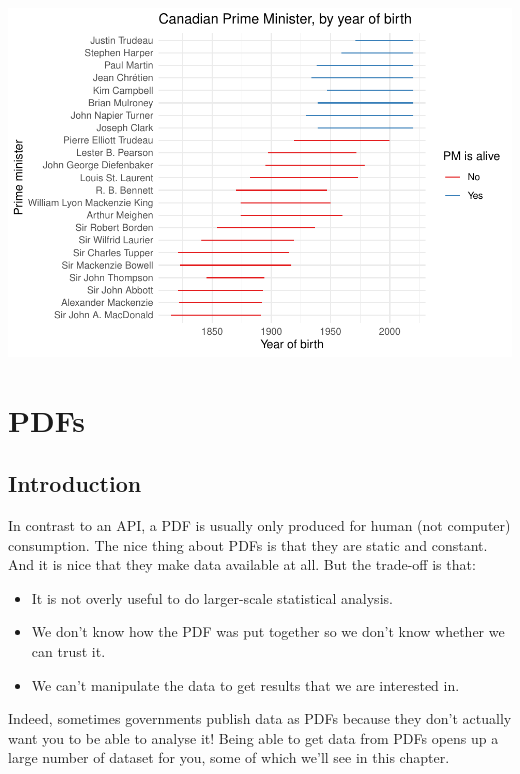 \documentclass[
]{book}
\providecommand{\tightlist}{%
  \setlength{\itemsep}{0pt}\setlength{\parskip}{0pt}}
\begin{document}
\includegraphics{telling_stories_with_data_files/figure-latex/unnamed-chunk-169-1.pdf}

\hypertarget{pdfs}{%
\section{PDFs}\label{pdfs}}

\hypertarget{introduction-11}{%
\subsection{Introduction}\label{introduction-11}}

In contrast to an API, a PDF is usually only produced for human (not computer) consumption. The nice thing about PDFs is that they are static and constant. And it is nice that they make data available at all. But the trade-off is that:

\begin{itemize}
\tightlist
\item
  It is not overly useful to do larger-scale statistical analysis.
\item
  We don't know how the PDF was put together so we don't know whether we can trust it.
\item
  We can't manipulate the data to get results that we are interested in.
\end{itemize}

Indeed, sometimes governments publish data as PDFs because they don't actually want you to be able to analyse it! Being able to get data from PDFs opens up a large number of dataset for you, some of which we'll see in this chapter.
\end{document}

